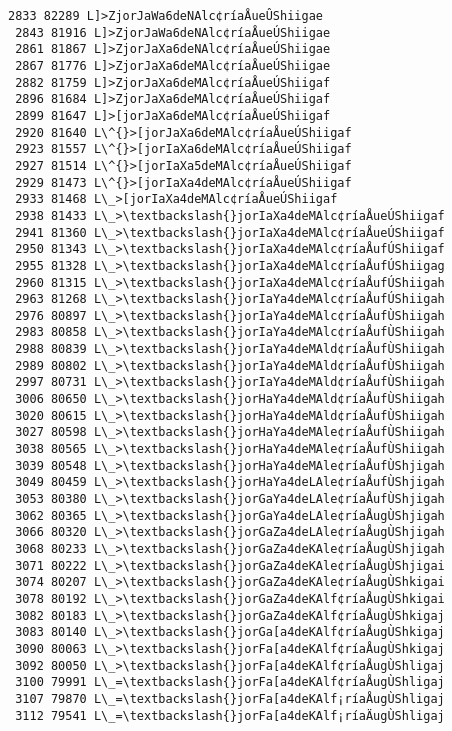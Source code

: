 \documentclass[11pt]{article}
\begin{document}
\begin{Verbatim}[commandchars=\\\{\}]
 2833 82289 L]>ZjorJaWa6deNAlc¢ríaÅueÛShiigae
 2843 81916 L]>ZjorJaWa6deNAlc¢ríaÅueÚShiigae
 2861 81867 L]>ZjorJaXa6deNAlc¢ríaÅueÚShiigae
 2867 81776 L]>ZjorJaXa6deMAlc¢ríaÅueÚShiigae
 2882 81759 L]>ZjorJaXa6deMAlc¢ríaÅueÚShiigaf
 2896 81684 L]>ZjorJaXa6deMAlc¢ríaÅueÚShiigaf
 2899 81647 L]>[jorJaXa6deMAlc¢ríaÅueÚShiigaf
 2920 81640 L\^{}>[jorJaXa6deMAlc¢ríaÅueÚShiigaf
 2923 81557 L\^{}>[jorIaXa6deMAlc¢ríaÅueÚShiigaf
 2927 81514 L\^{}>[jorIaXa5deMAlc¢ríaÅueÚShiigaf
 2929 81473 L\^{}>[jorIaXa4deMAlc¢ríaÅueÚShiigaf
 2933 81468 L\_>[jorIaXa4deMAlc¢ríaÅueÚShiigaf
 2938 81433 L\_>\textbackslash{}jorIaXa4deMAlc¢ríaÅueÚShiigaf
 2941 81360 L\_>\textbackslash{}jorIaXa4deMAlc¢ríaÅueÚShiigaf
 2950 81343 L\_>\textbackslash{}jorIaXa4deMAlc¢ríaÅufÚShiigaf
 2955 81328 L\_>\textbackslash{}jorIaXa4deMAlc¢ríaÅufÚShiigag
 2960 81315 L\_>\textbackslash{}jorIaXa4deMAlc¢ríaÅufÚShiigah
 2963 81268 L\_>\textbackslash{}jorIaYa4deMAlc¢ríaÅufÚShiigah
 2976 80897 L\_>\textbackslash{}jorIaYa4deMAlc¢ríaÅufÙShiigah
 2983 80858 L\_>\textbackslash{}jorIaYa4deMAlc¢ríaÅufÙShiigah
 2988 80839 L\_>\textbackslash{}jorIaYa4deMAld¢ríaÅufÙShiigah
 2989 80802 L\_>\textbackslash{}jorIaYa4deMAld¢ríaÅufÙShiigah
 2997 80731 L\_>\textbackslash{}jorIaYa4deMAld¢ríaÅufÙShiigah
 3006 80650 L\_>\textbackslash{}jorHaYa4deMAld¢ríaÅufÙShiigah
 3020 80615 L\_>\textbackslash{}jorHaYa4deMAld¢ríaÅufÙShiigah
 3027 80598 L\_>\textbackslash{}jorHaYa4deMAle¢ríaÅufÙShiigah
 3038 80565 L\_>\textbackslash{}jorHaYa4deMAle¢ríaÅufÙShiigah
 3039 80548 L\_>\textbackslash{}jorHaYa4deMAle¢ríaÅufÙShjigah
 3049 80459 L\_>\textbackslash{}jorHaYa4deLAle¢ríaÅufÙShjigah
 3053 80380 L\_>\textbackslash{}jorGaYa4deLAle¢ríaÅufÙShjigah
 3062 80365 L\_>\textbackslash{}jorGaYa4deLAle¢ríaÅugÙShjigah
 3066 80320 L\_>\textbackslash{}jorGaZa4deLAle¢ríaÅugÙShjigah
 3068 80233 L\_>\textbackslash{}jorGaZa4deKAle¢ríaÅugÙShjigah
 3071 80222 L\_>\textbackslash{}jorGaZa4deKAle¢ríaÅugÙShjigai
 3074 80207 L\_>\textbackslash{}jorGaZa4deKAle¢ríaÅugÙShkigai
 3078 80192 L\_>\textbackslash{}jorGaZa4deKAlf¢ríaÅugÙShkigai
 3082 80183 L\_>\textbackslash{}jorGaZa4deKAlf¢ríaÅugÙShkigaj
 3083 80140 L\_>\textbackslash{}jorGa[a4deKAlf¢ríaÅugÙShkigaj
 3090 80063 L\_>\textbackslash{}jorFa[a4deKAlf¢ríaÅugÙShkigaj
 3092 80050 L\_>\textbackslash{}jorFa[a4deKAlf¢ríaÅugÙShligaj
 3100 79991 L\_=\textbackslash{}jorFa[a4deKAlf¢ríaÅugÙShligaj
 3107 79870 L\_=\textbackslash{}jorFa[a4deKAlf¡ríaÅugÙShligaj
 3112 79541 L\_=\textbackslash{}jorFa[a4deKAlf¡ríaÄugÙShligaj

\end{Verbatim}
\end{document}
